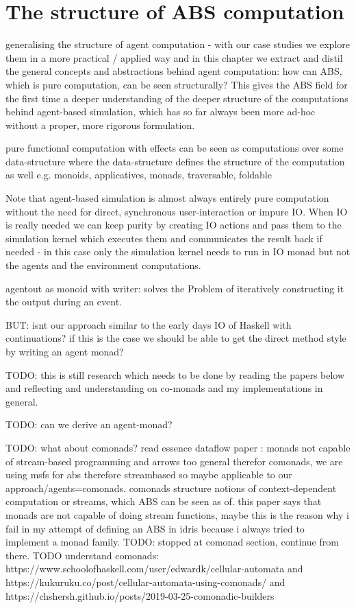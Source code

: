 \chapter{The structure of ABS computation}
generalising the structure of agent computation - with our case studies we explore them in a more practical / applied way and in this chapter we extract and distil the general concepts and abstractions behind agent computation: how can ABS, which is pure computation, can be seen structurally? This gives the ABS field for the first time a deeper understanding of the deeper structure of the computations behind agent-based simulation, which has so far always been more ad-hoc without a proper, more rigorous formulation. 

pure functional computation with effects can be seen as computations over some data-structure where the data-structure defines the structure of the computation as well e.g. monoids, applicatives, monads, traversable, foldable

Note that agent-based simulation is almost always entirely pure computation without the need for direct, synchronous user-interaction or impure IO. When IO is really needed we can keep purity by creating IO actions and pass them to the simulation kernel which executes them and communicates the result back if needed - in this case only the simulation kernel needs to run in IO monad but not the agents and the environment computations.

agentout as monoid with writer: solves the Problem of iteratively constructing it the output during an event.

BUT: isnt our approach similar to the early days IO of Haskell with continuations? if this is the case we should be able to get the direct method style by writing an agent monad?

TODO: this is still research which needs to be done by reading the papers below and reflecting  and understanding on co-monads and my implementations in general.

TODO: can we derive an agent-monad?

TODO: what about comonads? read essence dataflow paper \cite{uustalu_essence_2006}: monads not capable of stream-based programming and arrows too general therefor comonads, we are using msfs for abs therefore streambased so maybe applicable to our approach/agents=comonads. comonads structure notions of context-dependent computation or streams, which ABS can be seen as of. this paper says that monads are not capable of doing stream functions, maybe this is the reason why i fail in my attempt of defining an ABS in idris because i always tried to implement a monad family. TODO: stopped at comonad section, continue from there. TODO understand comonads: https://www.schoolofhaskell.com/user/edwardk/cellular-automata and https://kukuruku.co/post/cellular-automata-using-comonads/ and https://chshersh.github.io/posts/2019-03-25-comonadic-builders

